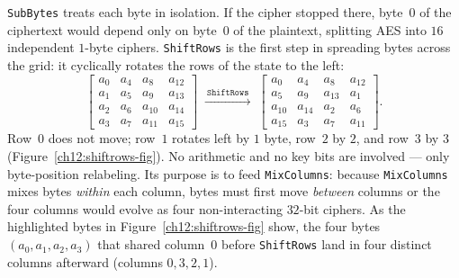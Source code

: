 \texttt{SubBytes} treats each byte in isolation. If the cipher stopped there, byte~$0$
of the ciphertext would depend only on byte~$0$ of the plaintext, splitting AES into
$16$ independent $1$-byte ciphers. \texttt{ShiftRows} is the first step in spreading
bytes across the grid: it cyclically rotates the rows of the state to the left:
\[
\begin{bmatrix}
a_{0} & a_{4} & a_{8} & a_{12}\\
a_{1} & a_{5} & a_{9} & a_{13}\\
a_{2} & a_{6} & a_{10} & a_{14}\\
a_{3} & a_{7} & a_{11} & a_{15}
\end{bmatrix}
\;\xrightarrow{\ \texttt{ShiftRows}\ }\;
\begin{bmatrix}
a_{0} & a_{4} & a_{8} & a_{12}\\
a_{5} & a_{9} & a_{13} & a_{1}\\
a_{10} & a_{14} & a_{2} & a_{6}\\
a_{15} & a_{3} & a_{7} & a_{11}
\end{bmatrix}.
\]
Row~$0$ does not move; row~$1$ rotates left by $1$ byte, row~$2$ by $2$, and
row~$3$ by $3$ (Figure~\ref{ch12:shiftrows-fig}). No arithmetic and no key bits
are involved --- only byte-position relabeling. Its purpose is to feed
\texttt{MixColumns}: because \texttt{MixColumns} mixes bytes \emph{within} each
column, bytes must first move \emph{between} columns or the four columns would
evolve as four non-interacting $32$-bit ciphers. As the highlighted bytes in
Figure~\ref{ch12:shiftrows-fig} show, the four bytes $(a_0,a_1,a_2,a_3)$ that
shared column~$0$ before \texttt{ShiftRows} land in four distinct columns
afterward (columns $0, 3, 2, 1$).

